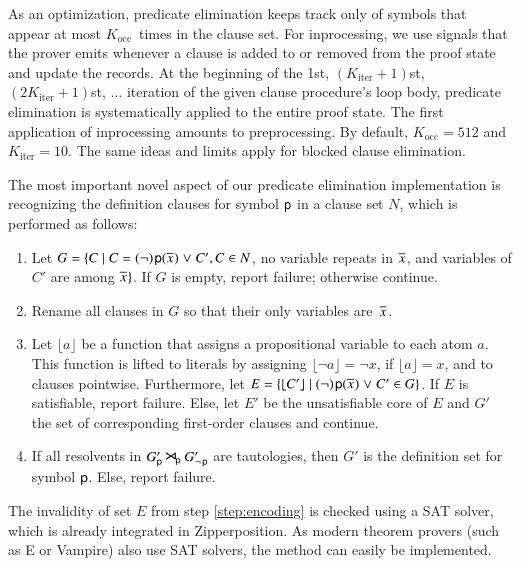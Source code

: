 As an optimization, predicate elimination keeps track only of symbols that appear
at most $K_\mathrm{occ}$~times in the clause set. For inprocessing, we use
signals that the prover emits whenever a clause is added to or removed from
the proof state and update the records. At the beginning of the
1st, $(K_\mathrm{iter} + 1)$st, $(2 K_\mathrm{iter} + 1)$st, $\dots{}$ iteration of the given clause procedure's
loop body, predicate elimination is systematically applied to the entire proof
state. The first application of inprocessing amounts to preprocessing. By
default, $K_\mathrm{occ} = 512$ and $K_\mathrm{iter}=10$. The same ideas and
limits apply for blocked clause elimination.

The most important novel aspect of our predicate elimination implementation is
recognizing the definition clauses for symbol $\mathsf{p}$ in a clause set $N$, which is performed
as follows:
\begin{enumerate}
   \item Let $G = \{ C \mid C = (\neg)\kern.2ex{\mathsf{p}(\overline{x}_{})} \mathrel{\lor} C', C \in
   N$, no variable repeats in $\overline{x}_{}$, and variables of $C'$ are among
   $\overline{x}_{}\}$. If $G$ is empty, report failure; otherwise continue.

   \smallskip
   \item Rename all clauses in $G$ so that their only variables are~$\overline{x}_{}$.

   \smallskip
   \item\label{step:encoding} Let $\lfloor a \rfloor$ be a function that assigns
   a propositional variable to each atom $a$. This function is lifted to
   literals by assigning $\lfloor \neg a \rfloor  = \neg x$, if $\lfloor a
   \rfloor = x$, and to clauses pointwise. Furthermore,  
   let $E = \{ \lfloor C' \rfloor \mid
   (\neg)\kern.2ex{\mathsf{p}(\overline{x}_{})} \mathrel{\lor} C' \in G \}$. If $E$ is satisfiable,
   report failure. Else, let $E'$ be the unsatisfiable core of $E$
   and $G'$ the set of corresponding first-order clauses and continue.

   \smallskip
   \item If all resolvents in $G'_{{\mathsf{p}}} \mathbin{\smash{\hbox{\Large$\kern-.1ex\rtimes$}}}_{\!\mathsf{p}}
   G'_{\neg{\kern.2ex \mathsf{p}}}$ are tautologies, then $G'$ is the definition set
   for symbol $\mathsf{p}$. Else, report failure.
\end{enumerate}

The invalidity of set $E$ from step \ref{step:encoding} is checked using a SAT
solver, which is already integrated in Zipperposition. As modern theorem provers
(such as E or Vampire) also use SAT solvers, the method can easily be
implemented.


